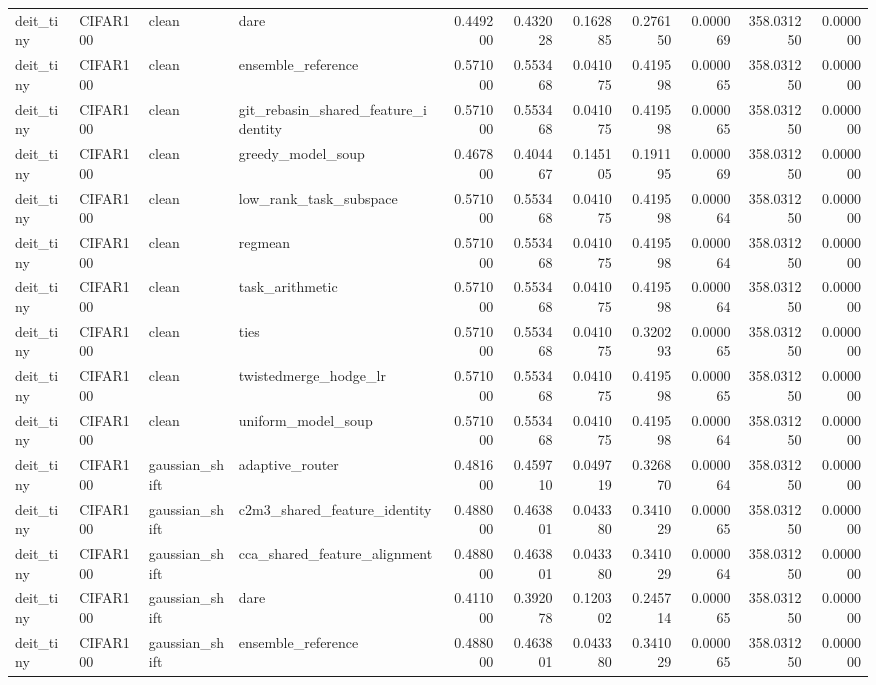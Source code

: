 \begin{tabular}{llllrrrrrrr}
deit_tiny & CIFAR100 & clean & dare & 0.449200 & 0.432028 & 0.162885 & 0.276150 & 0.000069 & 358.031250 & 0.000000 \\
deit_tiny & CIFAR100 & clean & ensemble_reference & 0.571000 & 0.553468 & 0.041075 & 0.419598 & 0.000065 & 358.031250 & 0.000000 \\
deit_tiny & CIFAR100 & clean & git_rebasin_shared_feature_identity & 0.571000 & 0.553468 & 0.041075 & 0.419598 & 0.000065 & 358.031250 & 0.000000 \\
deit_tiny & CIFAR100 & clean & greedy_model_soup & 0.467800 & 0.404467 & 0.145105 & 0.191195 & 0.000069 & 358.031250 & 0.000000 \\
deit_tiny & CIFAR100 & clean & low_rank_task_subspace & 0.571000 & 0.553468 & 0.041075 & 0.419598 & 0.000064 & 358.031250 & 0.000000 \\
deit_tiny & CIFAR100 & clean & regmean & 0.571000 & 0.553468 & 0.041075 & 0.419598 & 0.000064 & 358.031250 & 0.000000 \\
deit_tiny & CIFAR100 & clean & task_arithmetic & 0.571000 & 0.553468 & 0.041075 & 0.419598 & 0.000064 & 358.031250 & 0.000000 \\
deit_tiny & CIFAR100 & clean & ties & 0.571000 & 0.553468 & 0.041075 & 0.320293 & 0.000065 & 358.031250 & 0.000000 \\
deit_tiny & CIFAR100 & clean & twistedmerge_hodge_lr & 0.571000 & 0.553468 & 0.041075 & 0.419598 & 0.000065 & 358.031250 & 0.000000 \\
deit_tiny & CIFAR100 & clean & uniform_model_soup & 0.571000 & 0.553468 & 0.041075 & 0.419598 & 0.000064 & 358.031250 & 0.000000 \\
deit_tiny & CIFAR100 & gaussian_shift & adaptive_router & 0.481600 & 0.459710 & 0.049719 & 0.326870 & 0.000064 & 358.031250 & 0.000000 \\
deit_tiny & CIFAR100 & gaussian_shift & c2m3_shared_feature_identity & 0.488000 & 0.463801 & 0.043380 & 0.341029 & 0.000065 & 358.031250 & 0.000000 \\
deit_tiny & CIFAR100 & gaussian_shift & cca_shared_feature_alignment & 0.488000 & 0.463801 & 0.043380 & 0.341029 & 0.000064 & 358.031250 & 0.000000 \\
deit_tiny & CIFAR100 & gaussian_shift & dare & 0.411000 & 0.392078 & 0.120302 & 0.245714 & 0.000065 & 358.031250 & 0.000000 \\
deit_tiny & CIFAR100 & gaussian_shift & ensemble_reference & 0.488000 & 0.463801 & 0.043380 & 0.341029 & 0.000065 & 358.031250 & 0.000000 \\

\end{tabular}
